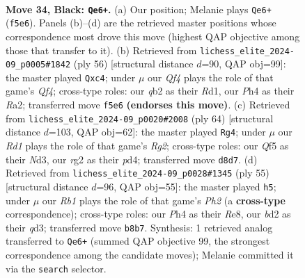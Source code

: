 \documentclass[11pt]{article}
\begin{document}
\clearpage

\begin{figure}[p]\centering
\begin{subfigure}{0.46\textwidth}\centering
\resizebox{\linewidth}{!}{%
\newchessgame
\chessboard[
  setfen={1r1rnk2/p1p5/5p2/2P2q2/3P1P1p/1P6/1Q1BK1RP/5BR1 b - - 0 34},
  showmover=false,
  pgfstyle=straightmove, color=movearrow, markmove={f5-e6}
]}
\caption{}
\end{subfigure}\hfill
\begin{subfigure}{0.46\textwidth}\centering
\resizebox{\linewidth}{!}{%
\newchessgame
\chessboard[
  setfen={1r2rbk1/1q3pp1/3p3p/2pP4/2p2Q2/2P2N1P/R4PP1/3R2K1 w - - 3 29},
  showmover=false,
  pgfstyle=straightmove, color=movearrow, markmove={f4-c4}
]}
\caption{}
\end{subfigure}
\\[4pt]
\begin{subfigure}{0.46\textwidth}\centering
\resizebox{\linewidth}{!}{%
\newchessgame
\chessboard[
  setfen={4r1k1/p1q1r1pp/5p2/5Q2/3p1p1P/1P1N4/P4PRK/8 w - - 3 33},
  showmover=false,
  pgfstyle=straightmove, color=movearrow, markmove={g2-g4}
]}
\caption{}
\end{subfigure}\hfill
\begin{subfigure}{0.46\textwidth}\centering
\resizebox{\linewidth}{!}{%
\newchessgame
\chessboard[
  setfen={1n2r3/p1k4p/2pq1rp1/8/3P4/3Q2P1/PP3P1P/2RR1BK1 b - - 2 28},
  showmover=false,
  pgfstyle=straightmove, color=movearrow, markmove={h7-h5}
]}
\caption{}
\end{subfigure}
\caption{\textbf{Move 34, Black: \texttt{Qe6+}.} (a) Our position; Melanie plays \texttt{Qe6+} (\texttt{f5e6}). Panels (b)--(d) are the retrieved master positions whose correspondence most drove this move (highest QAP objective among those that transfer to it). (b) Retrieved from \texttt{lichess\_elite\_2024-09\_p0005\#1842} (ply 56) [structural distance $d$=90, QAP obj=99]: the master played \texttt{Qxc4}; under $\mu$ our \emph{Qf4} plays the role of that game's \emph{Qf4}; cross-type roles: our \emph{q}b2 as their \emph{R}d1, our \emph{P}h4 as their \emph{R}a2; transferred move \texttt{f5e6} \textbf{(endorses this move)}. (c) Retrieved from \texttt{lichess\_elite\_2024-09\_p0020\#2008} (ply 64) [structural distance $d$=103, QAP obj=62]: the master played \texttt{Rg4}; under $\mu$ our \emph{Rd1} plays the role of that game's \emph{Rg2}; cross-type roles: our \emph{Q}f5 as their \emph{N}d3, our \emph{r}g2 as their \emph{p}d4; transferred move \texttt{d8d7}. (d) Retrieved from \texttt{lichess\_elite\_2024-09\_p0028\#1345} (ply 55) [structural distance $d$=96, QAP obj=55]: the master played \texttt{h5}; under $\mu$ our \emph{Rb1} plays the role of that game's \emph{Ph2} (a \textbf{cross-type} correspondence); cross-type roles: our \emph{P}h4 as their \emph{R}e8, our \emph{b}d2 as their \emph{q}d3; transferred move \texttt{b8b7}. Synthesis: 1 retrieved analog transferred to \texttt{Qe6+} (summed QAP objective 99, the strongest correspondence among the candidate moves); Melanie committed it via the \texttt{search} selector.}
\label{fig:thought-m67}
\end{figure}
\end{document}
